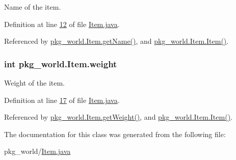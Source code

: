 Name of the item. 



Definition at line \hyperlink{Item_8java_source_l00012}{12} of file \hyperlink{Item_8java_source}{Item.\-java}.



Referenced by \hyperlink{Item_8java_source_l00040}{pkg\-\_\-world.\-Item.\-get\-Name()}, and \hyperlink{Item_8java_source_l00030}{pkg\-\_\-world.\-Item.\-Item()}.

\hypertarget{classpkg__world_1_1Item_aa5dd085ecf4205cb6e2b316ab5509731}{
\subsubsection[{weight}]{\setlength{\rightskip}{0pt plus 5cm}int pkg\-\_\-world.\-Item.\-weight\hspace{0.3cm}{\ttfamily [private]}}}\label{classpkg__world_1_1Item_aa5dd085ecf4205cb6e2b316ab5509731}


Weight of the item. 



Definition at line \hyperlink{Item_8java_source_l00017}{17} of file \hyperlink{Item_8java_source}{Item.\-java}.



Referenced by \hyperlink{Item_8java_source_l00048}{pkg\-\_\-world.\-Item.\-get\-Weight()}, and \hyperlink{Item_8java_source_l00030}{pkg\-\_\-world.\-Item.\-Item()}.



The documentation for this class was generated from the following file\-:\begin{DoxyCompactItemize}
\item 
pkg\-\_\-world/\hyperlink{Item_8java}{Item.\-java}\end{DoxyCompactItemize}
